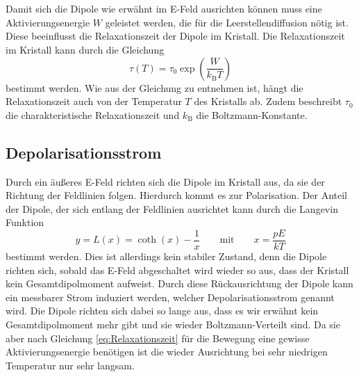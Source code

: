 \\\\
Damit sich die Dipole wie erwähnt im E-Feld ausrichten können muss eine Aktivierungsenergie $W$ geleistet werden, die für die Leerstellendiffusion nötig ist.
Diese beeinflusst die Relaxationszeit der Dipole im Kristall.
Die Relaxationszeit im Kristall kann durch die Gleichung 
\begin{equation}
    \tau(T) = \tau_0 \exp( \frac{W}{k_\text{B} T})
    \label{eq:Relaxationszeit}
\end{equation}
bestimmt werden.
Wie aus der Gleichung zu entnehmen ist, hängt die Relaxationszeit auch von der Temperatur $T$ des Kristalls ab.
Zudem beschreibt $\tau_0$ die charakteristische Relaxationszeit und $k_\text{B}$ die Boltzmann-Konstante.

\subsection{Depolarisationsstrom}
Durch ein äußeres E-Feld richten sich die Dipole im Kristall aus, da sie der Richtung der Feldlinien folgen.
Hierdurch kommt es zur Polarisation.
Der Anteil der Dipole, der sich entlang der Feldlinien ausrichtet kann durch die Langevin Funktion
\begin{equation}
    y = L(x) = \coth(x)-\frac{1}{x} \qquad \text{mit} \qquad x=\frac{pE}{kT}
    \label{eq:Langevin}
\end{equation}
bestimmt werden.
Dies ist allerdings kein stabiler Zustand, denn die Dipole richten sich, sobald das E-Feld abgeschaltet wird wieder so aus, dass der Kristall kein Gesamtdipolmoment aufweist.
Durch diese Rückausrichtung der Dipole kann ein messbarer Strom induziert werden, welcher Depolarisationsstrom genannt wird.
Die Dipole richten sich dabei so lange aus, dass es wir erwähnt kein Gesamtdipolmoment mehr gibt und sie wieder Boltzmann-Verteilt sind.
Da sie aber nach Gleichung \eqref{eq:Relaxationszeit} für die Bewegung eine gewisse Aktivierungsenergie benötigen ist die wieder Ausrichtung bei sehr niedrigen Temperatur nur sehr langsam.


